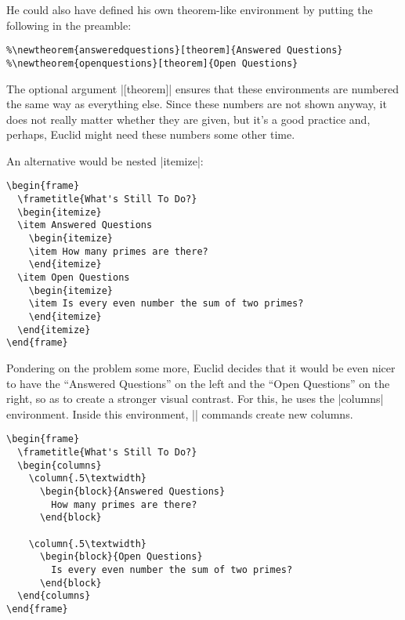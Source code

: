 He could also have defined his own theorem-like environment by putting the following in the preamble:
\begin{verbatim}
%\newtheorem{answeredquestions}[theorem]{Answered Questions}
%\newtheorem{openquestions}[theorem]{Open Questions}
\end{verbatim}
The optional argument |[theorem]| ensures that these environments are numbered the same way as everything else. Since these numbers are not shown anyway, it does not really matter whether they are given, but it's a good practice and, perhaps, Euclid might need these numbers some other time.

An alternative would be nested |itemize|:
\begin{verbatim}
\begin{frame}
  \frametitle{What's Still To Do?}
  \begin{itemize}
  \item Answered Questions
    \begin{itemize}
    \item How many primes are there?
    \end{itemize}
  \item Open Questions
    \begin{itemize}
    \item Is every even number the sum of two primes?
    \end{itemize}
  \end{itemize}
\end{frame}
\end{verbatim}

Pondering on the problem some more, Euclid decides that it would be even nicer to have the ``Answered Questions'' on the left and the ``Open Questions'' on the right, so as to create a stronger visual contrast. For this, he uses the |columns| environment. Inside this environment, |\column| commands create new columns.
\begin{verbatim}
\begin{frame}
  \frametitle{What's Still To Do?}
  \begin{columns}
    \column{.5\textwidth}
      \begin{block}{Answered Questions}
        How many primes are there?
      \end{block}

    \column{.5\textwidth}
      \begin{block}{Open Questions}
        Is every even number the sum of two primes?
      \end{block}
  \end{columns}
\end{frame}
\end{verbatim}

